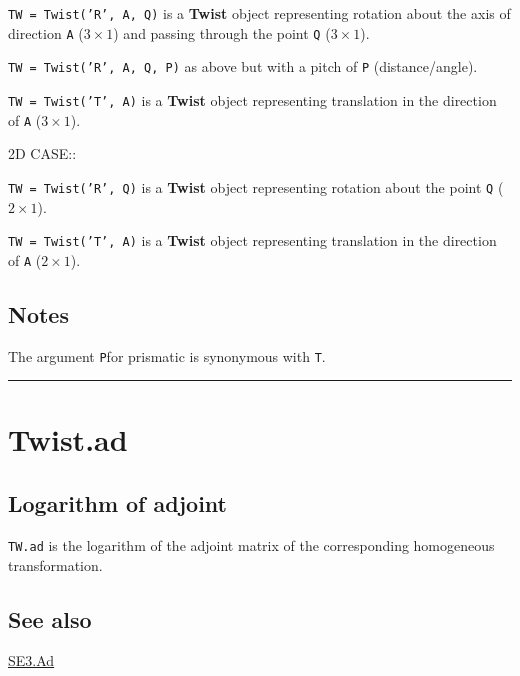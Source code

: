 \texttt{TW = Twist('R', A, Q)} is a \textbf{\color{red} Twist} object representing rotation about the
axis of direction \texttt{A} ($3 \times 1$) and passing through the point \texttt{Q} ($3 \times 1$).



\texttt{TW = Twist('R', A, Q, P)} as above but with a pitch of \texttt{P} (distance/angle).



\texttt{TW = Twist('T', A)} is a \textbf{\color{red} Twist} object representing translation in the
direction of \texttt{A} ($3 \times 1$).



2D CASE::



\texttt{TW = Twist('R', Q)} is a \textbf{\color{red} Twist} object representing rotation about the point \texttt{Q} ($2 \times 1$).



\texttt{TW = Twist('T', A)} is a \textbf{\color{red} Twist} object representing translation in the
direction of \texttt{A} ($2 \times 1$).


\subsection*{Notes}


The argument \textquotesingle \texttt{P}\textquotesingle  for prismatic is synonymous with \textquotesingle \texttt{T}\textquotesingle .

\vspace{1.5ex}\hrule

\hypertarget{Twist.ad}{\section*{Twist.ad}}
\subsection*{Logarithm of adjoint}


\texttt{TW.ad} is the logarithm of the adjoint matrix of the corresponding
homogeneous transformation.


\subsection*{See also}


\hyperlink{SE3.Ad}{\color{blue} SE3.Ad}

